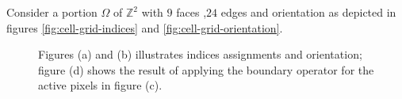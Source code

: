 \begin{example}
	Consider a portion $\Omega$ of $\mathbb{Z}^2$ with $9$ faces ,$24$ edges and orientation as depicted in figures \ref{fig:cell-grid-indices} and \ref{fig:cell-grid-orientation}. 	
	
\begin{figure}[h!]
\center
{}\hspace{1em}%
\hspace{1em}%
\hspace{1em}%
%
\caption{Figures (a) and (b) illustrates indices assignments and orientation; figure (d) shows the result of applying the boundary operator for the active pixels in figure (c).}
\end{figure}


\end{example}
